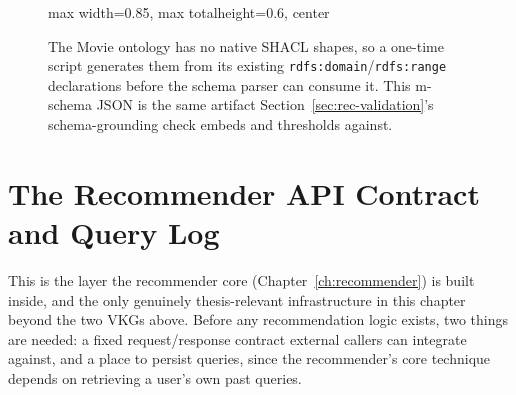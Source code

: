 \documentclass[11pt,a4paper,oneside]{book}
\newcommand{\code}[1]{\texttt{#1}}
\begin{document}
\begin{figure}[H]
\centering
\begin{adjustbox}{max width=0.85\textwidth, max totalheight=0.6\textheight, center}
\end{adjustbox}
\caption{The Movie ontology has no native SHACL shapes, so a one-time script generates them from
its existing \code{rdfs:domain}/\code{rdfs:range} declarations before the schema parser can consume
it. This m-schema JSON is the same artifact Section~\ref{sec:rec-validation}'s schema-grounding
check embeds and thresholds against.}
\label{fig:arch-shacl}
\end{figure}

\section{The Recommender API Contract and Query Log}
\label{sec:arch-api}

This is the layer the recommender core (Chapter~\ref{ch:recommender}) is built inside, and the
only genuinely thesis-relevant infrastructure in this chapter beyond the two VKGs above. Before any
recommendation logic exists, two things are needed: a fixed request/response contract external
callers can integrate against, and a place to persist queries, since the recommender's core
technique depends on retrieving a user's own past queries.
\end{document}
